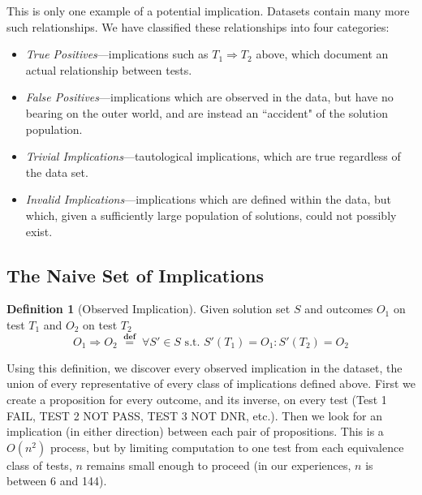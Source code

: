 \documentclass[11pt,twoside]{article}
\newcommand\defined{\mathrel{\;\stackrel{\scriptscriptstyle\mathbf{def}}{=}\;}}
\theoremstyle{definition}
\newtheorem{defn}{Definition}
\begin{document}
This is only one example of a potential implication. Datasets contain many more such relationships. We have classified these relationships into four categories:
\begin{itemize}
\item \emph{True Positives}---implications such as $T_1 \Rightarrow T_2$ above, which document an actual relationship between tests. 
\item \emph{False Positives}---implications which are observed in the data, but have no bearing on the outer world, and are instead an ``accident" of the solution population. 
\item \emph{Trivial Implications}---tautological implications, which are true regardless of the data set. 
\item \emph{Invalid Implications}---implications which are defined within the data, but which, given a sufficiently large population of solutions, could not possibly exist.
\end{itemize}


\subsection{The Naive Set of Implications}
\begin{defn}[Observed Implication]
Given solution set $S$ and outcomes $O_1$ on test $T_1$ and $O_2$ on test $T_2$
$$O_1 \Rightarrow O_2 \defined \forall S' \in S \mbox{ s.t. } S'(T_1) = O_1 : S'(T_2) = O_2$$
\end{defn}

Using this definition, we discover every observed implication in the dataset, the union of every representative of every class of implications defined above. First we create a proposition for every outcome, and its inverse, on every test (Test 1 FAIL, TEST 2 NOT PASS, TEST 3 NOT DNR, etc.). Then we look for an implication (in either direction) between each pair of propositions. This is a $O(n^2)$ process, but by limiting computation to one test from each equivalence class of tests, $n$ remains small enough to proceed (in our experiences, $n$ is between 6 and 144).
\end{document}
